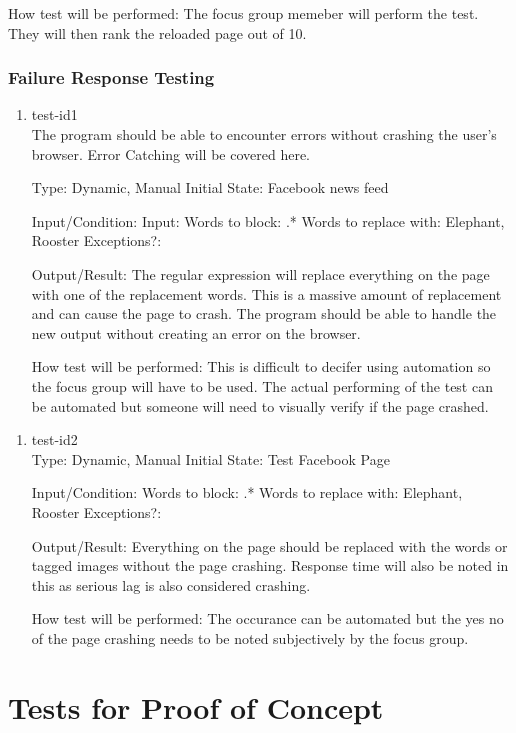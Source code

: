 \documentclass[12pt, titlepage]{article}
\begin{document}
\begin{enumerate}
\begin{enumerate}
How test will be performed: The focus group memeber will perform the test. They will then rank the reloaded page out of 10.
\end{enumerate}
\subsubsection{Failure Response Testing} %
\begin{enumerate}
\item{test-id1\\}
The program should be able to encounter errors without crashing the user's browser. Error Catching will be covered here.

Type: Dynamic, Manual
Initial State: Facebook news feed
					
Input/Condition: Input: Words to block: .*
Words to replace with: Elephant, Rooster
Exceptions?: 
					
Output/Result: The regular expression will replace everything on the page with one of the replacement words. This is a massive amount of replacement and can cause the page to crash. The program should be able to handle the new output without creating an error on the browser.
					
How test will be performed: This is difficult to decifer using automation so the focus group will have to be used. The actual performing of the test can be automated but someone will need to visually verify if the page crashed.
\end{enumerate}
\begin{enumerate}
\item{test-id2\\}
Type: Dynamic, Manual
Initial State: Test Facebook Page
					
Input/Condition: Words to block: .*
Words to replace with: Elephant, Rooster
Exceptions?: 
					
Output/Result: Everything on the page should be replaced with the words or tagged images without the page crashing. Response time will also be noted in this as serious lag is also considered crashing.
					
How test will be performed: The occurance can be automated but the yes no of the page crashing needs to be noted subjectively by the focus group.
\end{enumerate}
\section{Tests for Proof of Concept}

\end{enumerate}
\end{document}
